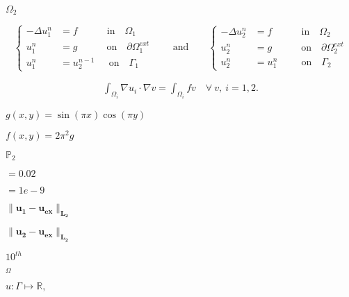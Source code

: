\documentclass{article}
\begin{document}
$\Omega_2$
\pagebreak

\begin{equation} \label{eq:34} \left \{ \begin{aligned} -\Delta u_1^n & = f \quad \qquad \text{in} \quad \Omega_1 \\ u_1^n & = g \quad \qquad \text{on} \quad \partial \Omega_1^{ext}\\ u_1^n & = u_2^{n-1} \quad ~~ \text{on} \quad \Gamma_1 \end{aligned} \right. \qquad \text{and} \qquad \left \{ \begin{aligned} - \Delta u_2^n & = f \quad \qquad \text{in} \quad \Omega_2 \\ u_2^n & = g \quad \qquad \text{on} \quad \partial \Omega_2^{ext}\\ u_2^n & = u_1^n \qquad~~ \text{on} \quad \Gamma_2 \end{aligned} \right. \end{equation}
\pagebreak

\begin{equation*} \begin{aligned} \int_{\Omega_i} \nabla u_i \cdot \nabla v = \int_{\Omega_i} fv \quad \forall~ v,~i=1,2. \end{aligned} \end{equation*}
\pagebreak

$ g(x,y) = \sin(\pi x)\cos(\pi y)$
\pagebreak

$f(x,y) = 2\pi^2g$
\pagebreak

$\mathbb P_2$
\pagebreak

$= 0.02$
\pagebreak

$=1e-9$
\pagebreak

$\mathbf {\| u_1-u_{ex}\|_{L_2} }$
\pagebreak

$\mathbf{\| u_2-u_{ex}\|_{L_2}}$
\pagebreak

$ 10^{th}$
\pagebreak

$_{\Omega}$
\pagebreak

$u: \Gamma \longmapsto \mathbb R, $
\pagebreak
\end{document}
